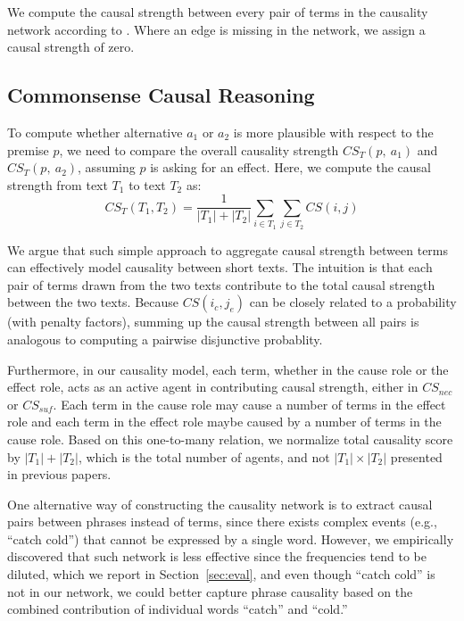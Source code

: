 We compute the causal strength between every pair of terms in the
causality network
according to . Where an edge is missing in the network,
we assign a causal strength of zero.

\subsection{Commonsense Causal Reasoning}
\label{sec:reasoning}

To compute whether alternative $a_1$ or $a_2$ is more plausible
with respect to the premise $p$, we need to compare the overall causality
strength $CS_T(p,~a_1)$ and $CS_T(p,~a_2)$, assuming $p$ is asking
for an effect. Here, we compute the causal strength from
text $T_1$ to text $T_2$ as:
\begin{equation}
CS_T(T_1,T_2)=\frac{1}{|T_1|+|T_2|}\sum_{i \in T_1}\sum_{j \in T_2}
CS(i, j)
\label{eq:csall}
\end{equation}

We argue that such simple approach to aggregate causal strength between terms
can effectively model causality between short texts.
The intuition is that each pair of terms drawn from the two texts contribute
to the total causal strength between the two texts. Because $CS(i_c, j_e)$
can be closely related to a probability (with penalty factors),
summing up the causal strength between all pairs is analogous to
computing a pairwise disjunctive probablity.

Furthermore, in our causality model, each term, whether in the cause role
or the effect role, acts as an active agent in contributing causal strength,
either in $CS_{nec}$ or $CS_{suf}$. Each term in the cause role may
cause a number of terms in the effect role and each term in the effect role
maybe caused by a number of terms in the cause role.
Based on this one-to-many relation, we normalize total causality score by
$|T_1|+|T_2|$, which is the total number of agents,
and not $|T_1|\times|T_2|$ presented in previous papers.

One alternative way of constructing the causality network is to extract
causal pairs between phrases instead of terms, since there exists complex
events (e.g., ``catch cold'') that cannot be expressed by a single word.
However, we empirically discovered that such network is less
effective since the frequencies tend to be diluted,
which we report in Section~\ref{sec:eval}, and even though ``catch cold''
is not in our network, we could better capture
phrase causality based on the combined contribution of individual words
``catch'' and ``cold.''
